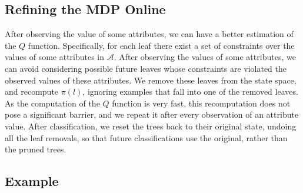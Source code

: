 \documentclass[letterpaper]{article}
\theoremstyle{definition}
\begin{document}
\subsection{Refining the MDP Online}
\label{sec:RefineMDP}

After observing the value of some attributes, we can have a better estimation of the $Q$ function. Specifically, for each leaf there exist a set of constraints over the values of some attributes in $\mathcal{A}$.
After observing the values of some attributes, we can avoid considering possible future leaves whose constraints are violated  the observed values of these attributes. We remove these leaves from the state space, and recompute $\pi(l)$, ignoring examples that fall into one of the removed leaves. As the computation of the $Q$ function is very fast, this recomputation does not pose a significant barrier, and we repeat it after every observation of an attribute value. After classification, we reset the trees back to their original state, undoing all the leaf removals, so that future classifications use the original, rather than the pruned trees.












\subsection{Example}
\end{document}
